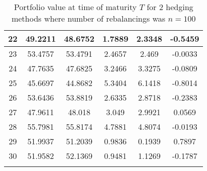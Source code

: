 \documentclass[times, utf8, diplomski]{fer}
\begin{document}
\begin{longtable}{c c c c c c}
\hline
22 & 49.2211 & 48.6752 & 1.7889 & 2.3348 & -0.5459 \\
\hline
23 & 53.4757 & 53.4791 & 2.4657 & 2.469 & -0.0033 \\
\hline
24 & 47.7635 & 47.6825 & 3.2466 & 3.3275 & -0.0809 \\
\hline
25 & 45.6697 & 44.8682 & 5.3404 & 6.1418 & -0.8014 \\
\hline
26 & 53.6436 & 53.8819 & 2.6335 & 2.8718 & -0.2383 \\
\hline
27 & 47.9611 & 48.018 & 3.049 & 2.9921 & 0.0569 \\
\hline
28 & 55.7981 & 55.8174 & 4.7881 & 4.8074 & -0.0193 \\
\hline
29 & 51.9937 & 51.2039 & 0.9836 & 0.1939 & 0.7897 \\
\hline
30 & 51.9582 & 52.1369 & 0.9481 & 1.1269 & -0.1787 \\
\hline
\caption{Portfolio value at time of maturity $T$ for $2$ hedging methods where number of rebalancings was $n=100$}
\end{longtable}
\end{document}
